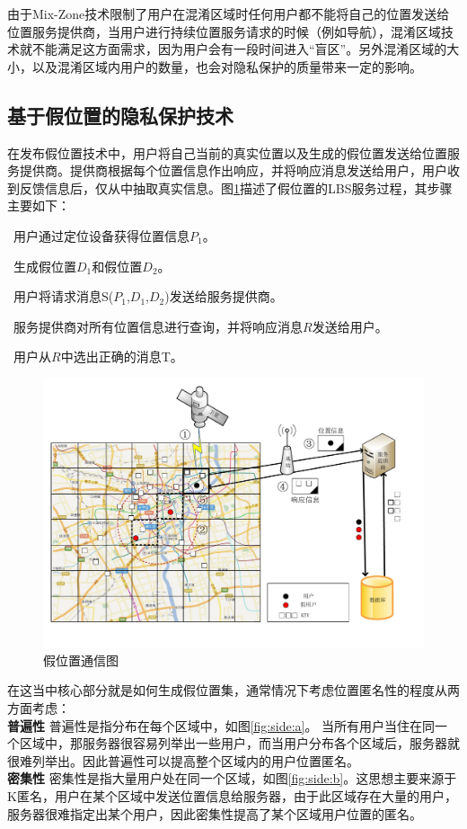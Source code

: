 由于Mix-Zone技术限制了用户在混淆区域时任何用户都不能将自己的位置发送给位置服务提供商，当用户进行持续位置服务请求的时候（例如导航），混淆区域技术就不能满足这方面需求，因为用户会有一段时间进入“盲区”。另外混淆区域的大小，以及混淆区域内用户的数量，也会对隐私保护的质量带来一定的影响。

\subsection{基于假位置的隐私保护技术}
在发布假位置技术中，用户将自己当前的真实位置以及生成的假位置发送给位置服务提供商。提供商根据每个位置信息作出响应，并将响应消息发送给用户，用户收到反馈信息后，仅从中抽取真实信息。图\ref{fig:Dummy_pdf}描述了假位置的LBS服务过程，其步骤主要如下：	

~用户通过定位设备获得位置信息$P_1$。

~生成假位置$D_1$和假位置$D_2$。

~用户将请求消息S($P_1$,$D_1$,$D_2$)发送给服务提供商。

~服务提供商对所有位置信息进行查询，并将响应消息$R$发送给用户。

~用户从$R$中选出正确的消息T。
\begin{figure}[H]
\centering
\includegraphics[width=12cm]{fig/Dummy.pdf}
\caption{假位置通信图} %
\label{fig:Dummy_pdf}
\end{figure}
在这当中核心部分就是如何生成假位置集，通常情况下考虑位置匿名性的程度从两方面考虑：\\
\textbf {普遍性} 普遍性是指分布在每个区域中，如图\ref{fig:side:a}。 当所有用户当住在同一个区域中，那服务器很容易列举出一些用户，而当用户分布各个区域后，服务器就很难列举出。因此普遍性可以提高整个区域内的用户位置匿名。\\
\textbf {密集性} 密集性是指大量用户处在同一个区域，如图\ref{fig:side:b}。这思想主要来源于K匿名，用户在某个区域中发送位置信息给服务器，由于此区域存在大量的用户，服务器很难指定出某个用户，因此密集性提高了某个区域用户位置的匿名。


